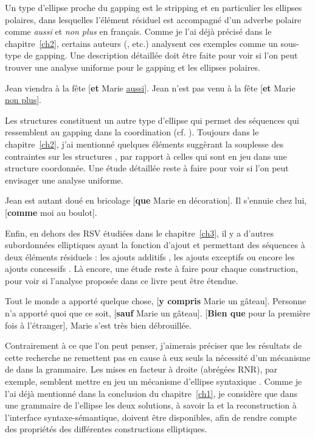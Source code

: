 Un type d’ellipse proche du gapping est le stripping et en particulier les ellipses polaires, dans lesquelles l’élément résiduel est accompagné d’un adverbe polaire comme \textit{aussi}  et \textit{non plus}  en français. Comme je l’ai déjà précisé dans le chapitre~\ref{ch2}, certains auteurs (\citealt{HankamerEtAl1976,Gardent1991,Lobeck1995,Hartmann2000,Toosarvandani2011}, etc.) analysent ces exemples comme un sous-type de gapping. Une description détaillée doit être faite pour voir si l’on peut trouver une analyse uniforme pour le gapping et les ellipses polaires.

\ea \label{concl:ex2}
\ea 
Jean viendra à la fête [\textbf{et} Marie \uline{aussi}]. \label{concl:ex2a} 
\ex
Jean n’est pas venu à la fête [\textbf{et} Marie \uline{non plus}]. \label{concl:ex2b}
\z 
\z

Les structures   constituent un autre type d’ellipse qui permet des séquences qui ressemblent au gapping dans la coordination (cf. \citealt{Zribi-Hertz1986,CulicoverEtAl2005,AmsiliEtAl2008}). Toujours dans le chapitre~\ref{ch2}, j’ai mentionné quelques éléments suggèrant la souplesse des contraintes sur les structures , par rapport à celles qui sont en jeu dans une structure coordonnée. Une étude détaillée reste à faire pour voir si l’on peut envisager une analyse uniforme.

\ea \label{concl:ex3}
\ea 
Jean est autant doué en bricolage [\textbf{que} Marie en décoration]. 
\ex
Il s’ennuie chez lui, [\textbf{comme} moi au boulot]. \citep{AmsiliEtAl2008}
\z 
\z 

Enfin, en dehors des RSV étudiées dans le chapitre~\ref{ch3}, il y a d’autres subordonnées elliptiques ayant la fonction d’ajout et permettant des séquences à deux éléments résiduels : les ajouts additifs , les ajouts exceptifs  ou encore les ajouts concessifs . Là encore, une étude reste à faire pour chaque construction, pour voir si l’analyse proposée dans ce livre peut être étendue.

\ea \label{concl:ex4}
\ea 
Tout le monde a apporté quelque chose, [\textbf{y compris} Marie un gâteau]. \label{concl:ex4a} 
\ex 
Personne n’a apporté quoi que ce soit, [\textbf{sauf} Marie un gâteau]. \label{concl:ex4b}
\ex {}
[\textbf{Bien que} pour la première fois à l’étranger], Marie s’est très bien débrouillée. \label{concl:ex4c}
\z 
\z

Contrairement à ce que l’on peut penser, j’aimerais préciser que les résultats de cette recherche ne remettent pas en cause à eux seuls la nécessité d’un mécanisme de  dans la grammaire. Les mises en facteur à droite (abrégées RNR), par exemple, semblent mettre en jeu un mécanisme d’ellipse syntaxique \citep{AbeilleEtAl2010,Chaves2014,AbeilleEtAl2016}. Comme je l’ai déjà mentionné dans la conclusion du chapitre~\ref{ch1}, je considère que dans une grammaire de l’ellipse les deux solutions, à savoir la  et la reconstruction à l’interface syntaxe-sémantique, doivent être disponibles, afin de rendre compte des propriétés des différentes constructions elliptiques.